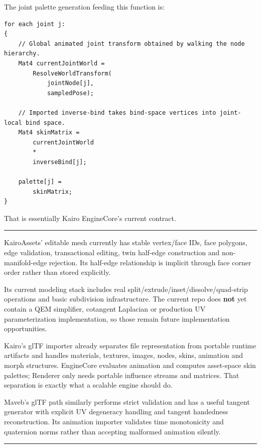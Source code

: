 The joint palette generation feeding this function is:

\begin{verbatim}
for each joint j:
{
    // Global animated joint transform obtained by walking the node hierarchy.
    Mat4 currentJointWorld =
        ResolveWorldTransform(
            jointNode[j],
            sampledPose);

    // Imported inverse-bind takes bind-space vertices into joint-local bind space.
    Mat4 skinMatrix =
        currentJointWorld
        *
        inverseBind[j];

    palette[j] =
        skinMatrix;
}
\end{verbatim}

That is essentially Kairo EngineCore's current contract.

\begin{center}\rule{0.5\linewidth}{0.5pt}\end{center}

KairoAssets' editable mesh currently has stable vertex/face IDs, face polygons, edge validation, transactional editing, twin half-edge construction and non-manifold-edge rejection. Its half-edge  relationship is implicit through face corner order rather than stored explicitly.

Its current modeling stack includes real split/extrude/inset/dissolve/quad-strip operations and basic subdivision infrastructure. The current repo does \textbf{not} yet contain a QEM simplifier, cotangent Laplacian or production UV parameterization implementation, so those remain future implementation opportunities.

Kairo's glTF importer already separates file representation from portable runtime artifacts and handles materials, textures, images, nodes, skins, animation and morph structures. EngineCore evaluates animation and computes asset-space skin palettes; Renderer only needs portable influence streams and matrices. That separation is exactly what a scalable engine should do.

Maveb's glTF path similarly performs strict validation and has a useful tangent generator with explicit UV degeneracy handling and tangent handedness reconstruction. Its animation importer validates time monotonicity and quaternion norms rather than accepting malformed animation silently.

\begin{center}\rule{0.5\linewidth}{0.5pt}\end{center}


